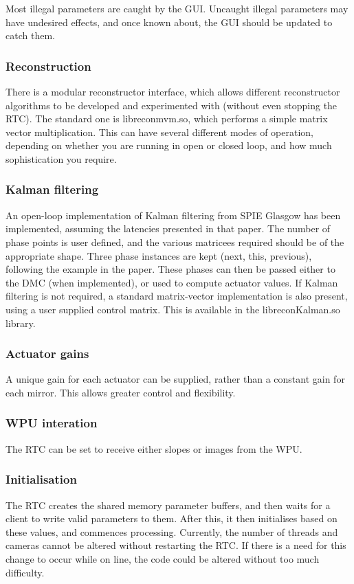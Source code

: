 \documentclass[a4,10pt]{article}
\begin{document}
Most illegal parameters are caught by the GUI.  Uncaught illegal
parameters may have undesired effects, and once known about, the GUI
should be updated to catch them.


\subsubsection{Reconstruction}
There is a modular reconstructor interface, which allows different
reconstructor algorithms to be developed and experimented with
(without even stopping the RTC).  The standard one is libreconmvm.so,
which performs a simple matrix vector multiplication.  This can have
several different modes of operation, depending on whether you are
running in open or closed loop, and how much sophistication you
require.  


\subsubsection{Kalman filtering}
An open-loop implementation of Kalman filtering from SPIE Glasgow has
been implemented, assuming the latencies presented in that paper.  The
number of phase points is user defined, and the various matricees
required should be of the appropriate shape.  Three phase instances
are kept (next, this, previous), following the example in the paper.
These phases can then be passed either to the DMC (when implemented),
or used to compute actuator values.  If Kalman filtering is not
required, a standard matrix-vector implementation is also present,
using a user supplied control matrix.  This is available in the
libreconKalman.so library.





\subsubsection{Actuator gains}
A unique gain for each actuator can be supplied, rather than a
constant gain for each mirror.  This allows greater control and
flexibility.

\subsubsection{WPU interation}
The RTC can be set to receive either slopes or images from the WPU.

\subsubsection{Initialisation}
The RTC creates the shared memory parameter buffers, and then waits
for a client to write valid parameters to them.  After this, it then
initialises based on these values, and commences processing.
Currently, the number of threads and cameras cannot be altered without
restarting the RTC.  If there is a need for this change to occur while
on line, the code could be altered without too much difficulty.
\end{document}

